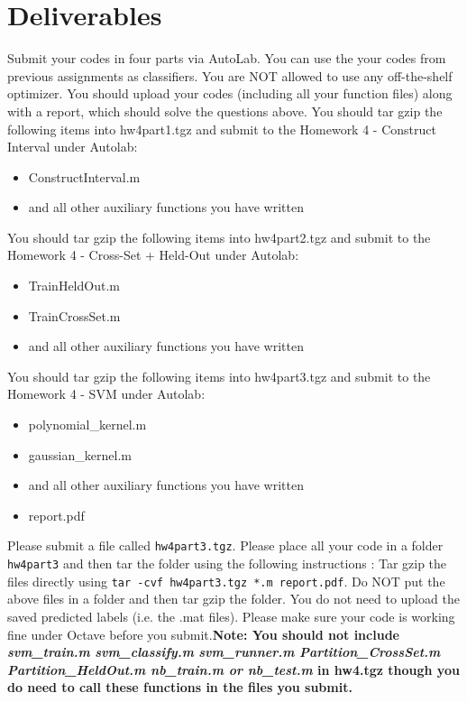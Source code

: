 \documentclass[11pt]{article}
\begin{document}
 \section{Deliverables}
 Submit your codes in four parts via AutoLab. You can use the your codes from previous assignments as classifiers. You are NOT allowed to use any off-the-shelf optimizer. You should upload your codes (including all your function files) along with a report, which should solve the questions above.\newline
You should tar gzip the following items into hw4part1.tgz and submit to the Homework 4 - Construct Interval under Autolab:
\begin{itemize}
\item ConstructInterval.m
\item and all other auxiliary functions you have written 
\end{itemize}
You should tar gzip the following items into hw4part2.tgz and submit to the Homework 4 - Cross-Set + Held-Out under Autolab:
\begin{itemize}
\item TrainHeldOut.m
\item TrainCrossSet.m
\item and all other auxiliary functions you have written 
\end{itemize}
You should tar gzip the following items into hw4part3.tgz and submit to the Homework 4 - SVM under Autolab:
\begin{itemize}
\item polynomial\_kernel.m
\item gaussian\_kernel.m
\item and all other auxiliary functions you have written 
\item report.pdf
\end{itemize}
Please submit a file called \texttt{hw4part3.tgz}. Please place all your code in a folder \texttt{hw4part3} and then tar the folder using the following instructions : \newline
Tar gzip the files directly using \texttt{tar -cvf hw4part3.tgz *.m report.pdf}. Do NOT put the above files in a folder and then tar gzip the folder. You do not need to upload the saved predicted labels (i.e. the .mat files). Please make sure your code is working fine under Octave before you submit.\newline \textbf{Note:  You should not include \textit{svm\_train.m} \textit{svm\_classify.m} \textit{svm\_runner.m} \textit{Partition\_CrossSet.m Partition\_HeldOut.m nb\_train.m or nb\_test.m} in hw4.tgz though you do need to call these functions in the files you submit. }

\end{document}
